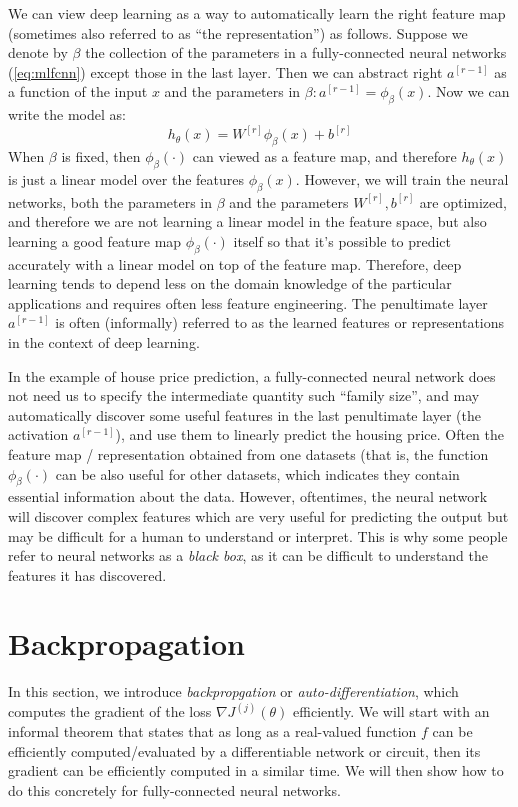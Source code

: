 We can view deep learning as a way to automatically learn the right
feature map (sometimes also referred to as ``the representation'') as follows.
Suppose we denote by $\beta$ the collection of the parameters in a fully-connected
neural networks (\cref{eq:mlfcnn}) except those in the last layer. Then we
can abstract right $a^{[r-1]}$ as a function of the input $x$ and the parameters in
$\beta: a^{[r-1]} = \phi_\beta(x)$. Now we can write the model as:
\begin{equation}
    h_\theta(x) = W^{[r]} \phi_\beta(x) + b^{[r]}
\end{equation}
When $\beta$ is fixed, then $\phi_\beta(\cdot)$ can viewed as a feature map, and therefore $h_\theta(x)$
is just a linear model over the features $\phi_\beta(x)$. However, we will train the
neural networks, both the parameters in $\beta$ and the parameters $W^{[r]}, b^{[r]}$ are
optimized, and therefore we are not learning a linear model in the feature
space, but also learning a good feature map $\phi_\beta(\cdot)$ itself so that it's possible to
predict accurately with a linear model on top of the feature map. Therefore,
deep learning tends to depend less on the domain knowledge of the particular
applications and requires often less feature engineering. The penultimate
layer $a^{[r-1]}$ is often (informally) referred to as the learned features or
representations in the context of deep learning.

In the example of house price prediction, a fully-connected neural network
does not need us to specify the intermediate quantity such ``family size'', and
may automatically discover some useful features in the last penultimate layer
(the activation $a^{[r-1]}$), and use them to linearly predict the housing price.
Often the feature map / representation obtained from one datasets (that is,
the function $\phi_\beta(\cdot)$ can be also useful for other datasets, which indicates they
contain essential information about the data. However, oftentimes, the neural
network will discover complex features which are very useful for predicting
the output but may be difficult for a human to understand or interpret. This
is why some people refer to neural networks as a \textit{black box}, as it can be
difficult to understand the features it has discovered.


\chapter{Backpropagation}\label{sec:backprop}
In this section, we introduce \textit{backpropgation} or \textit{auto-differentiation}, which
computes the gradient of the loss $\nabla J^{(j)}(\theta)$ efficiently. We will start with an
informal theorem that states that as long as a real-valued function $f$ can be
efficiently computed/evaluated by a differentiable network or circuit, then its
gradient can be efficiently computed in a similar time. We will then show
how to do this concretely for fully-connected neural networks.

